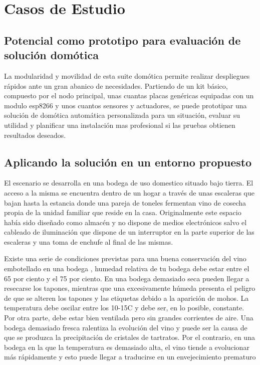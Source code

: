 \cleardoublepage

\chapter{Casos de Estudio}
\label{ch:Capitulo5}

\section{Potencial como prototipo para evaluación de solución domótica}
La modularidad y movilidad de esta suite domótica permite realizar despliegues rápidos ante un gran abanico de necesidades. Partiendo de un kit básico, compuesto por el nodo principal, unas cuantas placas genéricas equipadas con un modulo esp8266 y unos cuantos sensores y actuadores, se puede prototipar una solución de domótica automática personalizada para un situación, evaluar su utilidad y planificar una instalación mas profesional si las pruebas obtienen resultados deseados.


\section{Aplicando la solución en un entorno propuesto}
\label{ch:Capitulo5.1}
El escenario se desarrolla en una bodega de uso domestico situado bajo tierra. El acceso a la misma se encuentra dentro de un hogar a través de unas escaleras que bajan hasta la estancia donde una pareja de toneles fermentan vino de cosecha propia de la unidad familiar que reside en la casa. Originalmente este espacio había sido diseñado como almacén y no dispone de medios electrónicos salvo el cableado de iluminación que dispone de un interruptor en la parte superior de las escaleras y una toma de enchufe al final de las mismas.

Existe una serie de condiciones previstas para una buena conservación del vino embotellado en una bodega , humedad relativa de tu bodega debe estar entre el 65 por ciento y el 75 por ciento. En una bodega demasiado seca pueden llegar a resecarse los tapones, mientras que una excesivamente húmeda presenta el peligro de que se alteren los tapones y las etiquetas debido a la aparición de mohos. La temperatura debe oscilar entre los 10-15C y debe ser, en lo posible, constante. Por otra parte, debe estar bien ventilada pero sin grandes corrientes de aire. Una bodega demasiado fresca ralentiza la evolución del vino y puede ser la causa de que se produzca la precipitación de cristales de tartratos. Por el contrario, en una bodega en la que la temperatura es demasiado alta, el vino tiende a evolucionar más rápidamente y esto puede llegar a traducirse en un envejecimiento prematuro


